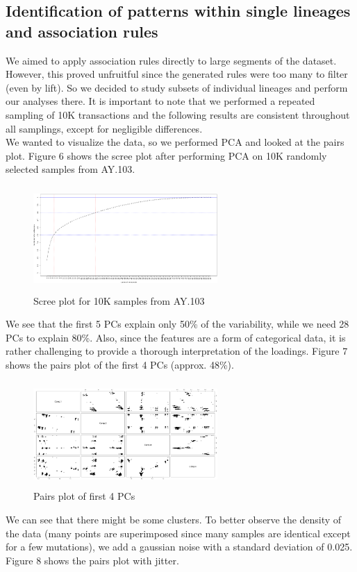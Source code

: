 \documentclass[twoside,twocolumn]{article}
\begin{document}
\subsection{Identification of patterns within single lineages and association rules}

We aimed to apply association rules directly to large segments of the dataset. However, this proved unfruitful since the generated rules were too many to filter (even by lift). So we decided to study subsets of individual lineages and perform our analyses there. It is important to note that we performed a repeated sampling of 10K transactions and the following results are consistent throughout all samplings, except for negligible differences. \\We wanted to visualize the data, so we performed PCA and looked at the pairs plot. Figure 6 shows the scree plot after performing PCA on 10K randomly selected samples from AY.103.
\begin{figure}[h]
	\caption{Scree plot for 10K samples from AY.103}
	\label{screeplot1}
	\centering
	\includegraphics[width=70mm, height=40mm]{scree.png}
\end{figure}
We see that the first 5 PCs explain only 50\% of the variability, while we need 28 PCs to explain 80\%. Also, since the features are a form of categorical data, it is rather challenging to provide a thorough interpretation of the loadings. Figure 7 shows the pairs plot of the first 4 PCs (approx. 48\%).
\begin{figure}[h]
	\caption{Pairs plot of first 4 PCs}
	\label{pairs}
	\centering
	\includegraphics[width=70mm, height=40mm]{pca1.png}
\end{figure}
We can see that there might be some clusters. To better observe the density of the data (many points are superimposed since many samples are identical except for a few mutations), we add a gaussian noise with a standard deviation of 0.025. Figure 8 shows the pairs plot with jitter.
\end{document}
